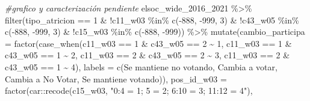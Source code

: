 \documentclass[
  12pt,
]{book}
\newenvironment{Shaded}{\begin{snugshade}}{\end{snugshade}}
\newcommand{\AttributeTok}[1]{\textcolor[rgb]{0.77,0.63,0.00}{#1}}
\newcommand{\CommentTok}[1]{\textcolor[rgb]{0.56,0.35,0.01}{\textit{#1}}}
\newcommand{\DecValTok}[1]{\textcolor[rgb]{0.00,0.00,0.81}{#1}}
\newcommand{\FunctionTok}[1]{\textcolor[rgb]{0.00,0.00,0.00}{#1}}
\newcommand{\NormalTok}[1]{#1}
\newcommand{\SpecialCharTok}[1]{\textcolor[rgb]{0.00,0.00,0.00}{#1}}
\newcommand{\StringTok}[1]{\textcolor[rgb]{0.31,0.60,0.02}{#1}}
\begin{document}
\begin{Shaded}
\begin{Highlighting}[]
\CommentTok{\#grafico y caracterización pendiente}
\NormalTok{elsoc\_wide\_2016\_2021 }\SpecialCharTok{\%\textgreater{}\%} 
  \FunctionTok{filter}\NormalTok{(tipo\_atricion }\SpecialCharTok{==} \DecValTok{1} \SpecialCharTok{\&} \SpecialCharTok{!}\NormalTok{c11\_w03 }\SpecialCharTok{\%in\%} \FunctionTok{c}\NormalTok{(}\SpecialCharTok{{-}}\DecValTok{888}\NormalTok{, }\SpecialCharTok{{-}}\DecValTok{999}\NormalTok{, }\DecValTok{3}\NormalTok{) }\SpecialCharTok{\&} \SpecialCharTok{!}\NormalTok{c43\_w05 }\SpecialCharTok{\%in\%} \FunctionTok{c}\NormalTok{(}\SpecialCharTok{{-}}\DecValTok{888}\NormalTok{, }\SpecialCharTok{{-}}\DecValTok{999}\NormalTok{, }\DecValTok{3}\NormalTok{) }\SpecialCharTok{\&}
           \SpecialCharTok{!}\NormalTok{c15\_w03 }\SpecialCharTok{\%in\%} \FunctionTok{c}\NormalTok{(}\SpecialCharTok{{-}}\DecValTok{888}\NormalTok{, }\SpecialCharTok{{-}}\DecValTok{999}\NormalTok{)) }\SpecialCharTok{\%\textgreater{}\%} 
  \FunctionTok{mutate}\NormalTok{(}\AttributeTok{cambio\_participa =} \FunctionTok{factor}\NormalTok{(}\FunctionTok{case\_when}\NormalTok{(c11\_w03 }\SpecialCharTok{==} \DecValTok{1} \SpecialCharTok{\&}\NormalTok{ c43\_w05 }\SpecialCharTok{==} \DecValTok{2} \SpecialCharTok{\textasciitilde{}} \DecValTok{1}\NormalTok{,}
\NormalTok{                                             c11\_w03 }\SpecialCharTok{==} \DecValTok{1} \SpecialCharTok{\&}\NormalTok{ c43\_w05 }\SpecialCharTok{==} \DecValTok{1} \SpecialCharTok{\textasciitilde{}} \DecValTok{2}\NormalTok{,}
\NormalTok{                                             c11\_w03 }\SpecialCharTok{==} \DecValTok{2} \SpecialCharTok{\&}\NormalTok{ c43\_w05 }\SpecialCharTok{==} \DecValTok{2} \SpecialCharTok{\textasciitilde{}} \DecValTok{3}\NormalTok{,}
\NormalTok{                                             c11\_w03 }\SpecialCharTok{==} \DecValTok{2} \SpecialCharTok{\&}\NormalTok{ c43\_w05 }\SpecialCharTok{==} \DecValTok{1} \SpecialCharTok{\textasciitilde{}} \DecValTok{4}\NormalTok{),}
                                   \AttributeTok{labels =} \FunctionTok{c}\NormalTok{(}\StringTok{\textquotesingle{}Se mantiene no votando\textquotesingle{}}\NormalTok{, }\StringTok{\textquotesingle{}Cambia a votar\textquotesingle{}}\NormalTok{,}
                                              \StringTok{\textquotesingle{}Cambia a No Votar\textquotesingle{}}\NormalTok{, }\StringTok{\textquotesingle{}Se mantiene votando\textquotesingle{}}\NormalTok{)),}
         \AttributeTok{pos\_id\_w03 =} \FunctionTok{factor}\NormalTok{(car}\SpecialCharTok{::}\FunctionTok{recode}\NormalTok{(c15\_w03, }\StringTok{"0:4 = 1; 5 = 2; 6:10 = 3; 11:12 = 4"}\NormalTok{),}

\end{Highlighting}
\end{Shaded}
\end{document}
